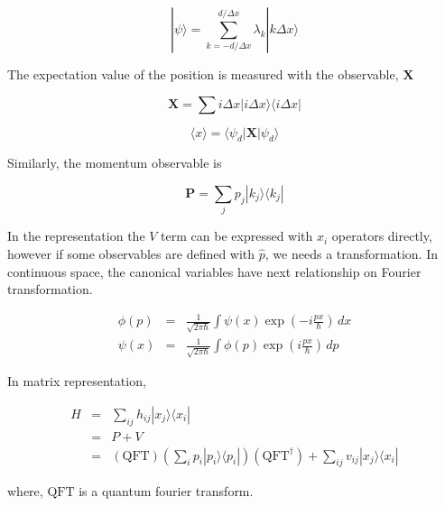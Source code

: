 \begin{equation}
    |\psi \rangle = \sum_{k = - d/\Delta x}^{d/{\Delta x}} \lambda_k | k \Delta x \rangle 
\end{equation}

The expectation value of the position is measured with the observable, $\mathbf{X}$

\begin{equation}
    \mathbf{X} = \sum i \Delta x |i \Delta x  \rangle \langle i \Delta x |
\end{equation}

\begin{equation}
    \langle x \rangle = \langle \psi_d |\mathbf{X} | \psi_d \rangle
\end{equation}


Similarly, the momentum observable is 

\begin{equation}
    \mathbf{P} = \sum_{j} p_j |k_j  \rangle \langle k_j |
\end{equation}



In the representation the $V$ term can be expressed with $x_i$ operators directly, however if some 
observables are defined with $\hat{p}$, we needs a transformation. 
In continuous space, the canonical variables have next relationship on Fourier transformation.

\begin{eqnarray}
    \phi(p) &=& \frac{1}{\sqrt{2\pi \hbar}}\int \psi(x) \exp\left(- i \frac{px}{\hbar} \right) \, dx \\
    \psi(x) &=& \frac{1}{\sqrt{2\pi \hbar}}\int \phi(p) \exp\left( i \frac{px}{\hbar} \right) \, dp 
\end{eqnarray}

In matrix representation,

\begin{eqnarray}
    H &=& \sum_{ij} h_{ij} | x_j \rangle \langle x_i| \\
      &=& P + V \\
      &=& (\mbox{QFT})(\sum_{i} p_{i} | p_i \rangle \langle p_i|) (\mbox{QFT}^{\dagger}) + \sum_{ij} v_{ij} | x_j \rangle \langle x_i|
\end{eqnarray}

where, $\mbox{QFT}$ is a quantum fourier transform. 

\begin{figure}[ht]
\end{figure}


